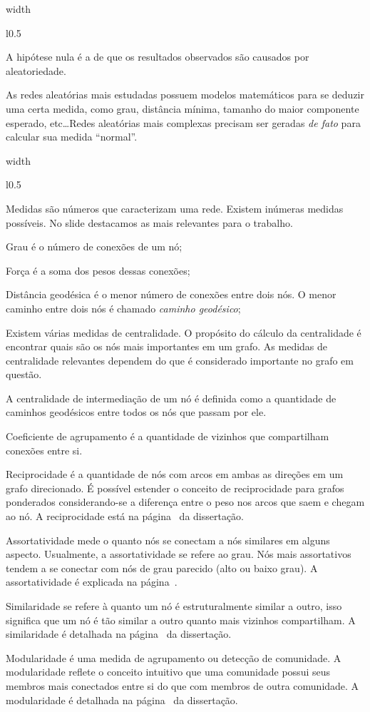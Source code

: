 \documentclass[10pt,a4paper,final]{article}
\newcommand\disappearingrule{%
  \par %
  \vskip10pt %
  \leaders\vrule width \textwidth\vskip0.4pt %
  \nointerlineskip %
  \vskip10pt %
}
\newenvironment{slideshort}[1]
{
  \disappearingrule
  
  \begin{minipage}[t][18\baselineskip]{\linewidth}
    \setlength{\parskip}{1ex}
    \begin{wrapfigure}{l}{0.5\textwidth}
      \includeslide[width=0.48\textwidth]{#1}
      \label{sde:#1}
    \end{wrapfigure}}
{\end{minipage}}
\newenvironment{slidelong}[1]
{
  \disappearingrule
  
  \begin{minipage}[t]{\linewidth}
    \setlength{\parskip}{1ex}
    \begin{wrapfigure}{l}{0.5\textwidth}
      \includeslide[width=0.48\textwidth]{#1}%
      \vspace{-0.8cm}
      \label{sde:#1}
    \end{wrapfigure}}
    {\end{minipage}}
\begin{document}
\begin{slideshort}{redes}
  A hipótese nula é a de que os resultados observados são causados por aleatoriedade.
  
  As redes aleatórias mais estudadas possuem modelos matemáticos para se deduzir uma certa medida, como grau, distância mínima, tamanho do maior componente esperado, etc\ldots Redes aleatórias mais complexas precisam ser geradas \textit{de fato} para calcular sua medida \enquote{normal}.
\end{slideshort}

\begin{slidelong}{medidas}
  Medidas são números que caracterizam uma rede. Existem inúmeras medidas possíveis. No slide destacamos as mais relevantes para o trabalho.
  
  Grau é o número de conexões de um nó;
  
  Força é a soma dos pesos dessas conexões;
  
  Distância geodésica é o menor número de conexões entre dois nós. O menor caminho entre dois nós é chamado \textit{caminho geodésico};
  
  Existem várias medidas de centralidade. O propósito do cálculo da centralidade é encontrar quais são os nós mais importantes em um grafo. As medidas de centralidade relevantes dependem do que é considerado importante no grafo em questão.
  
  A centralidade de intermediação de um nó é definida como a quantidade de caminhos geodésicos entre todos os nós que passam por ele.
  
  Coeficiente de agrupamento é a quantidade de vizinhos que compartilham conexões entre si.
  
  Reciprocidade é a quantidade de nós com arcos em ambas as direções em um grafo direcionado. É possível estender o conceito de reciprocidade para grafos ponderados considerando-se a diferença entre o peso nos arcos que saem e chegam ao nó. A reciprocidade está na página~\pageref{sec:reciprocidade} da dissertação.
  
  Assortatividade mede o quanto nós se conectam a nós similares em alguns aspecto. Usualmente, a assortatividade se refere ao grau. Nós mais assortativos tendem a se conectar com nós de grau parecido (alto ou baixo grau). A assortatividade é explicada na página~\pageref{sec:assortatividade}.
  
  Similaridade se refere à quanto um nó é estruturalmente similar a outro, isso significa que um nó é tão similar a outro quanto mais vizinhos compartilham. A similaridade é detalhada na página~\pageref{sec:similaridade} da dissertação.
  
  Modularidade é uma medida de agrupamento ou detecção de comunidade. A modularidade reflete o conceito intuitivo que uma comunidade possui seus membros mais conectados entre si do que com membros de outra comunidade. A modularidade é detalhada na página~\pageref{sec:modularidade} da dissertação.
\end{slidelong}
\end{document}
